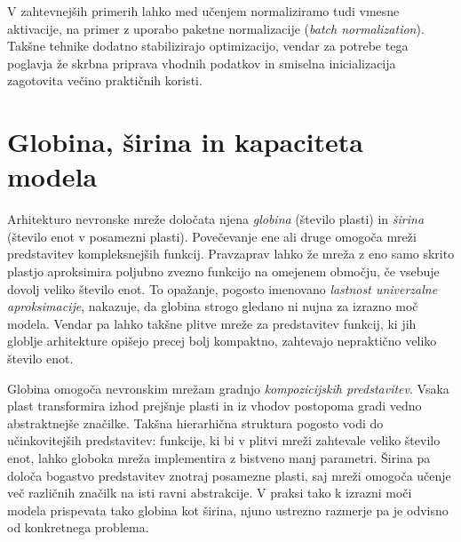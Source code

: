 V zahtevnejših primerih lahko med učenjem normaliziramo tudi vmesne aktivacije, na primer z uporabo paketne normalizacije ({\em batch normalization}). Takšne tehnike dodatno stabilizirajo optimizacijo, vendar za potrebe tega poglavja že skrbna priprava vhodnih podatkov in smiselna inicializacija zagotovita večino praktičnih koristi.


\section{Globina, širina in kapaciteta modela}

Arhitekturo nevronske mreže določata njena \emph{globina} (število plasti) in \emph{širina} (število enot v posamezni plasti). Povečevanje ene ali druge omogoča mreži predstavitev kompleksnejših funkcij. Pravzaprav lahko že mreža z eno samo skrito plastjo aproksimira poljubno zvezno funkcijo na omejenem območju, če vsebuje dovolj veliko število enot. To opažanje, pogosto imenovano \emph{lastnost univerzalne aproksimacije},
%
%
nakazuje, da globina strogo gledano ni nujna za izrazno moč modela. Vendar pa lahko takšne plitve mreže za predstavitev funkcij, ki jih globlje arhitekture opišejo precej bolj kompaktno, zahtevajo nepraktično veliko število enot.
%

Globina omogoča nevronskim mrežam gradnjo \emph{kompozicijskih predstavitev}. Vsaka plast transformira izhod prejšnje plasti in iz vhodov postopoma gradi vedno abstraktnejše značilke. Takšna hierarhična struktura pogosto vodi do učinkovitejših predstavitev: funkcije, ki bi v plitvi mreži zahtevale veliko število enot, lahko globoka mreža implementira z bistveno manj parametri. Širina pa določa bogastvo predstavitev znotraj posamezne plasti, saj mreži omogoča učenje več različnih značilk na isti ravni abstrakcije. V praksi tako k izrazni moči modela prispevata tako globina kot širina, njuno ustrezno razmerje pa je odvisno od konkretnega problema.

